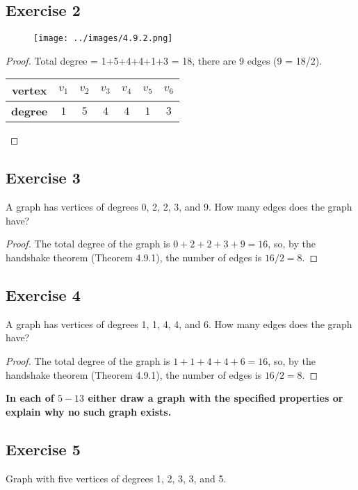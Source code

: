 \documentclass[14pt]{extarticle}
\newcommand{\cy}{\color{cyan}}
\begin{document}
\subsection{Exercise 2}
\begin{figure}[ht!]
    \centering
    \texttt{[image: ../images/4.9.2.png]}
\end{figure}

\begin{proof}
    Total degree = 1+5+4+4+1+3 = 18, there are 9 edges (9 = 18/2).
    \begin{center}
        \begin{tabular}{|c|c|c|c|c|c|c|}
            \hline
            {\bf vertex} & $v_1$ & $v_2$ & $v_3$ & $v_4$ & $v_5$ & $v_6$ \\
            \hline
            {\bf degree} & $1$   & $5$   & $4$   & $4$   & $1$   & $3$   \\
            \hline
        \end{tabular}
    \end{center}
\end{proof}

\subsection{Exercise 3}
A graph has vertices of degrees 0, 2, 2, 3, and 9. How many edges does the graph have?

\begin{proof}
    The total degree of the graph is $0 + 2 + 2 + 3 + 9 = 16$, so, by the handshake theorem (Theorem 4.9.1), the number of edges is $16/2 = 8$.
\end{proof}

\subsection{Exercise 4}
A graph has vertices of degrees 1, 1, 4, 4, and 6.
How many edges does the graph have?

\begin{proof}
    The total degree of the graph is $1 + 1 + 4 + 4 + 6 = 16$, so, by the handshake theorem (Theorem 4.9.1), the number of edges is $16/2 = 8$.
\end{proof}

{\bf \cy In each of $5-13$ either draw a graph with the specified properties or explain why no such graph exists.}

\subsection{Exercise 5}
Graph with five vertices of degrees 1, 2, 3, 3, and 5.
\end{document}
